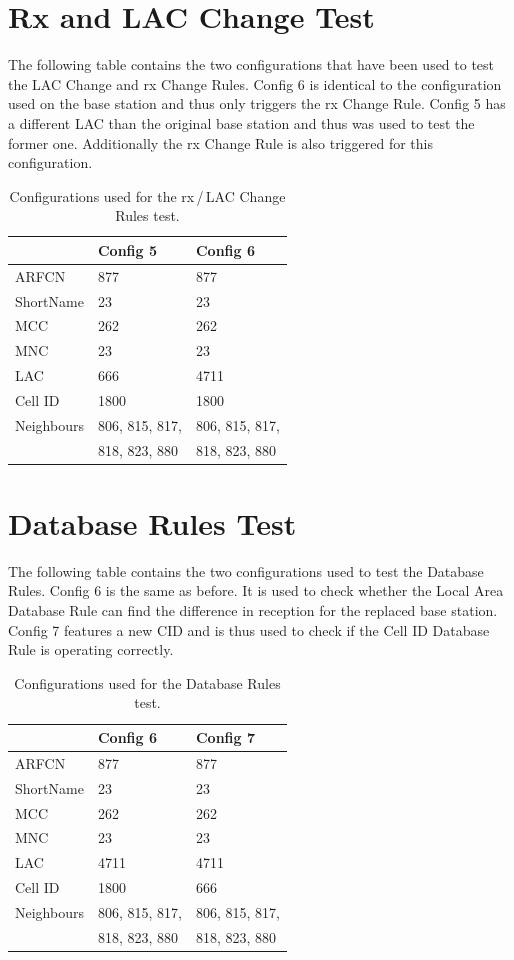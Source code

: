 \section{Rx and LAC Change Test}
\label{sec:lac_change_test}
The following table contains the two configurations that have been used to test the LAC Change and rx Change Rules.
Config 6 is identical to the configuration used on the base station and thus only triggers the rx Change Rule.
Config 5 has a different LAC than the original base station and thus was used to test the former one.
Additionally the rx Change Rule is also triggered for this configuration.
\begin{table}[h!]
\centering
\begin{tabular}{lll}
\toprule
			&Config 5		&Config 6\\
\midrule
ARFCN		&877			&877\\
ShortName	&23				&23\\
MCC			&262			&262\\
MNC			&23				&23\\
LAC			&666			&4711\\
Cell ID		&1800			&1800\\
Neighbours	&806, 815, 817,	&806, 815, 817, \\
			& 818, 823, 880	&818, 823, 880		\\
\bottomrule
\end{tabular}
\caption{Configurations used for the rx\,/\,LAC Change Rules test.}
\end{table}
\newpage
\section{Database Rules Test}
\label{sec:long_term_test}
The following table contains the two configurations used to test the Database Rules.
Config 6 is the same as before.
It is used to check whether the Local Area Database Rule can find the difference in reception for the replaced base station.
Config 7 features a new CID and is thus used to check if the Cell ID Database Rule is operating correctly.
\begin{table}[h!]
\centering
\begin{tabular}{lll}
\toprule
			&Config 6		&Config 7\\
\midrule
ARFCN		&877			&877\\
ShortName	&23				&23\\
MCC			&262			&262\\
MNC			&23				&23\\
LAC			&4711			&4711\\
Cell ID		&1800			&666\\
Neighbours	&806, 815, 817,	&806, 815, 817, \\
			& 818, 823, 880	&818, 823, 880		\\
\bottomrule
\end{tabular}
\caption{Configurations used for the Database Rules test.}
\end{table}
